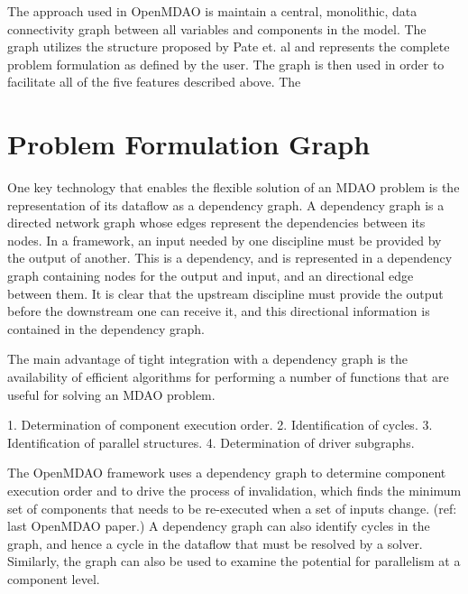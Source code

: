 \documentclass[]{aiaa-tc} %
\begin{document}
    The approach used in OpenMDAO is maintain a central, monolithic, data connectivity graph between all 
    variables and components in the model. The graph utilizes the structure proposed by Pate et. al \cite{graph_problem2013} 
    and represents the complete problem formulation as defined by the user. The graph is then used in order to 
    facilitate all of the five features described above. The 

  \section{Problem Formulation Graph}

    One key technology that enables the flexible solution of an MDAO problem is the representation
    of its dataflow as a dependency graph. A dependency graph is a directed network graph whose
    edges represent the dependencies between its nodes. In a framework, an input needed by one
    discipline must be provided by the output of another. This is a dependency, and is represented 
    in a dependency graph containing nodes for the output and input, and an directional edge
    between them. It is clear that the upstream discipline must provide the output before the 
    downstream one can receive it, and this directional information is contained in the dependency
    graph.

    The main advantage of tight integration with a dependency graph is the availability of efficient
    algorithms for performing a number of functions that are useful for solving an MDAO problem.

      1. Determination of component execution order.
      2. Identification of cycles.
      3. Identification of parallel structures.
      4. Determination of driver subgraphs.
      
    The OpenMDAO framework uses a dependency graph to determine component execution order and to
    drive the process of invalidation, which finds the minimum set of components that needs to
    be re-executed when a set of inputs change. (ref: last OpenMDAO paper.) A dependency graph
    can also identify cycles in the graph, and hence a cycle in the dataflow that must be resolved
    by a solver. Similarly, the graph can also be used to examine the potential for parallelism at
    a component level.
\end{document}
